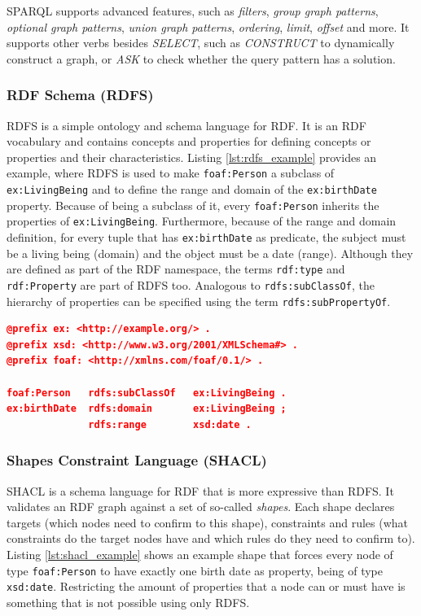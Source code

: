 SPARQL supports advanced features, such as \textit{filters}, \textit{group graph patterns}, \textit{optional graph patterns}, \textit{union graph patterns}, \textit{ordering}, \textit{limit}, \textit{offset} and more.
It supports other verbs besides \textit{SELECT}, such as \textit{CONSTRUCT} to dynamically construct a graph, or \textit{ASK} to check whether the query pattern has a solution.


\subsubsection{RDF Schema (RDFS)}
RDFS\cite{RDFS} is a simple ontology and schema language for RDF. 
It is an RDF vocabulary and contains concepts and properties for defining concepts or properties and their characteristics.
Listing \ref{lst:rdfs_example} provides an example, where RDFS is used to make \texttt{foaf:Person} a subclass of \texttt{ex:LivingBeing} and to define the range and domain of the \texttt{ex:birthDate} property.
Because of being a subclass of it, every \texttt{foaf:Person} inherits the properties of \texttt{ex:LivingBeing}.
Furthermore, because of the range and domain definition, for every tuple that has \texttt{ex:birthDate} as predicate, the subject must be a living being (domain) and the object must be a date (range).
Although they are defined as part of the RDF namespace, the terms \texttt{rdf:type} and \texttt{rdf:Property} are part of RDFS too.
Analogous to \texttt{rdfs:subClassOf}, the hierarchy of properties can be specified using the term \texttt{rdfs:subPropertyOf}.

\begin{lstlisting}[language=json,basicstyle=\scriptsize,firstnumber=1,caption={RDFS example},captionpos=b,label={lst:rdfs_example}]
@prefix ex: <http://example.org/> .
@prefix xsd: <http://www.w3.org/2001/XMLSchema#> .
@prefix foaf: <http://xmlns.com/foaf/0.1/> .

foaf:Person   rdfs:subClassOf   ex:LivingBeing .
ex:birthDate  rdfs:domain       ex:LivingBeing ;
              rdfs:range        xsd:date .
\end{lstlisting}

\subsubsection{Shapes Constraint Language (SHACL)}
SHACL\cite{SHACL} is a schema language for RDF that is more expressive than RDFS.
It validates an RDF graph against a set of so-called \textit{shapes}.
Each shape declares targets (which nodes need to confirm to this shape), constraints and rules (what constraints do the target nodes have and which rules do they need to confirm to).
Listing \ref{lst:shacl_example} shows an example shape that forces every node of type \texttt{foaf:Person} to have exactly one birth date as property, being of type \texttt{xsd:date}.
Restricting the amount of properties that a node can or must have is something that is not possible using only RDFS.


